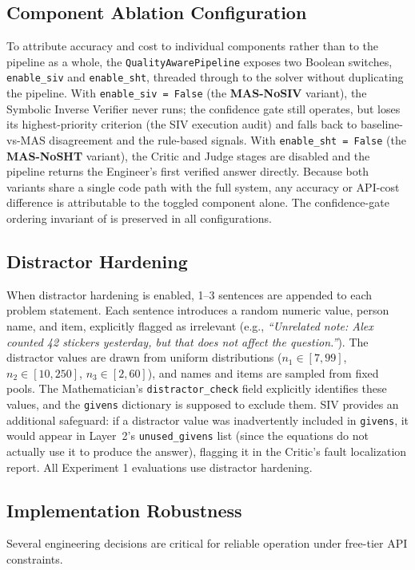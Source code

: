\documentclass[11pt,a4paper]{article}
\begin{document}
\subsection{Component Ablation Configuration}
\label{sec:ablation}
To attribute accuracy and cost to individual components rather than to the pipeline as a whole, the \texttt{QualityAwarePipeline} exposes two Boolean switches, \texttt{enable\_siv} and \texttt{enable\_sht}, threaded through to the solver without duplicating the pipeline.
With \texttt{enable\_siv = False} (the \textbf{MAS-NoSIV} variant), the Symbolic Inverse Verifier never runs; the confidence gate still operates, but loses its highest-priority criterion (the SIV execution audit) and falls back to baseline-vs-MAS disagreement and the rule-based signals.
With \texttt{enable\_sht = False} (the \textbf{MAS-NoSHT} variant), the Critic and Judge stages are disabled and the pipeline returns the Engineer's first verified answer directly.
Because both variants share a single code path with the full system, any accuracy or API-cost difference is attributable to the toggled component alone.
The confidence-gate ordering invariant of  is preserved in all configurations.
\subsection{Distractor Hardening}
\label{sec:hardener}
When distractor hardening is enabled, 1--3 sentences are appended to each problem statement.
Each sentence introduces a random numeric value, person name, and item, explicitly flagged as irrelevant (e.g., \emph{``Unrelated note: Alex counted 42 stickers yesterday, but that does not affect the question.''}).
The distractor values are drawn from uniform distributions ($n_1 \in [7, 99]$, $n_2 \in [10, 250]$, $n_3 \in [2, 60]$), and names and items are sampled from fixed pools.
The Mathematician's \texttt{distractor\_check} field explicitly identifies these values, and the \texttt{givens} dictionary is supposed to exclude them.
SIV provides an additional safeguard: if a distractor value was inadvertently included in \texttt{givens}, it would appear in Layer~2's \texttt{unused\_givens} list (since the equations do not actually use it to produce the answer), flagging it in the Critic's fault localization report.
All Experiment 1 evaluations use distractor hardening.
\subsection{Implementation Robustness}
\label{sec:robustness}
Several engineering decisions are critical for reliable operation under free-tier API constraints.
\end{document}
